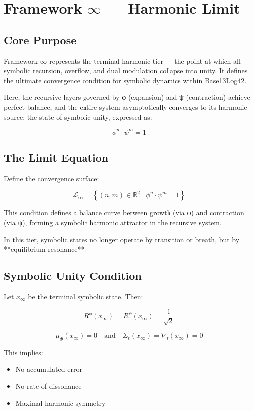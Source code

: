 \section*{Framework $\infty$ — Harmonic Limit}

\subsection*{Core Purpose}

Framework $\infty$ represents the terminal harmonic tier — the point at which all symbolic recursion, overflow, and dual modulation collapse into unity. It defines the ultimate convergence condition for symbolic dynamics within Base13Log42.

Here, the recursive layers governed by φ (expansion) and ψ (contraction) achieve perfect balance, and the entire system asymptotically converges to its harmonic source: the state of symbolic unity, expressed as:

\[
\phi^n \cdot \psi^m = 1
\]

\subsection*{The Limit Equation}

Define the convergence surface:

\[
\mathcal{L}_\infty = \left\{ (n, m) \in \mathbb{R}^2 \mid \phi^n \cdot \psi^m = 1 \right\}
\]

This condition defines a balance curve between growth (via φ) and contraction (via ψ), forming a symbolic harmonic attractor in the recursive system.

In this tier, symbolic states no longer operate by transition or breath, but by **equilibrium resonance**.

\subsection*{Symbolic Unity Condition}

Let $x_\infty$ be the terminal symbolic state. Then:

\[
R^\phi(x_\infty) = R^\psi(x_\infty) = \frac{1}{\sqrt{2}}
\]

\[
\mu_\Phi(x_\infty) = 0
\quad \text{and} \quad
\Sigma_t(x_\infty) = \nabla_t(x_\infty) = 0
\]

This implies:
\begin{itemize}
  \item No accumulated error
  \item No rate of dissonance
  \item Maximal harmonic symmetry
\end{itemize}

